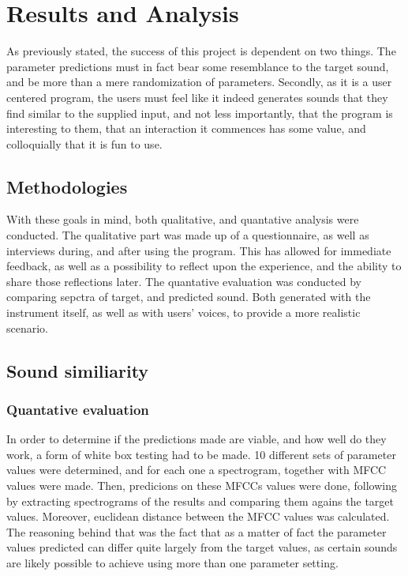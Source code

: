 \chapter{Results and Analysis}
As previously stated, the success of this project is dependent on two
things. The parameter predictions must in fact bear some resemblance to
the target sound, and be more than a mere randomization of
parameters. Secondly, as it is a user centered program, the users must
feel like it indeed generates sounds that they find similar to the
supplied input, and not less importantly, that the program is
interesting to them, that an interaction it commences has some value,
and colloquially that it is fun to use.

\section{Methodologies}

With these goals in mind, both qualitative, and quantative analysis
were conducted. The qualitative part was made up of a questionnaire,
as well as interviews during, and after using the program. This has
allowed for immediate feedback, as well as a possibility to reflect
upon the experience, and the ability to share those reflections
later. The quantative evaluation was conducted by comparing sepctra of
target, and predicted sound. Both generated with the instrument
itself, as well as with users' voices, to provide a more realistic
scenario. 

\section{Sound similiarity}

\subsection{Quantative evaluation}

In order to determine if the predictions made are viable, and how well
do they work, a form of white box testing had to be made. 10 different
sets of parameter values were determined, and for each one a
spectrogram, together with MFCC values were made. Then, predicions on
these MFCCs values were done, following by extracting spectrograms of
the results and comparing them agains the target values. Moreover,
euclidean distance between the MFCC values was calculated. The
reasoning behind that was the fact that as a matter of fact the
parameter values predicted can differ quite largely from the target
values, as certain sounds are likely possible to achieve using more
than one parameter setting.

